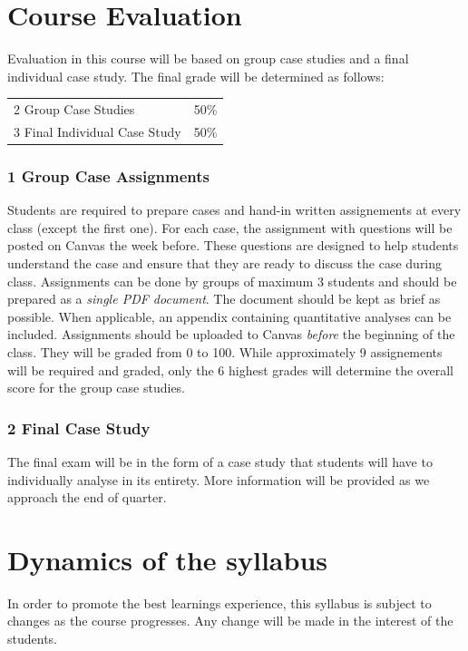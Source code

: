 \documentclass{article}
\begin{document}
\section*{Course Evaluation}

Evaluation in this course will be based on group case studies and a final individual case study.
The final grade will be determined as follows:

\vspace{.2in}
\begin{tabular}{p{2in}l}
2 Group Case Studies						&	50\% \\
3 Final Individual Case Study		&	50\%
\end{tabular}
\vspace{.2in}

\subsubsection*{1 Group Case Assignments}
Students are required to prepare cases and hand-in written assignements at
every class (except the first one).
For each case, the assignment with questions will be posted on Canvas the week before.
These questions are designed to help students understand the case and ensure that
they are ready to discuss the case during class.
Assignments can be done by groups of maximum 3 students and should be
prepared as a \emph{single PDF document}. The document should be kept as brief
as possible. When applicable, an appendix containing quantitative analyses can be included.
Assignments should be uploaded to Canvas \emph{before} the beginning of the
class. They will be graded from 0 to 100. While approximately 9 assignements
will be required and graded, only the 6 highest grades will determine
the overall score for the group case studies.

\subsubsection*{2 Final Case Study}
The final exam will be in the form of a case study that students will have to
individually analyse in its entirety.
More information will be provided as we approach the end of quarter.

\section*{Dynamics of the syllabus}
In order to promote the best learnings experience, this syllabus is subject to
changes as the course progresses. Any change will be made in the interest of
the students.
\end{document}
